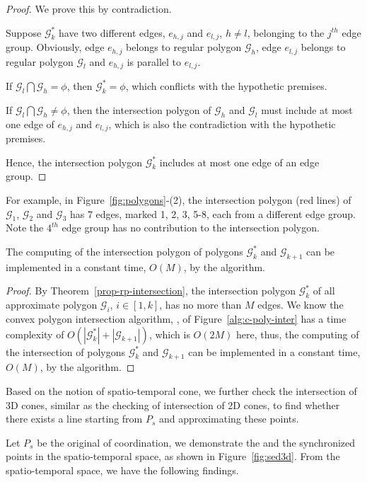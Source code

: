 \begin{proof}
We prove this by contradiction.

Suppose $\mathcal{G}^*_k$ have two different edges, $e_{h,j}$ and $e_{l,j}$, $h\ne l$, belonging to the $j^{th}$ edge group. Obviously, edge
$e_{h,j}$ belongs to regular polygon $\mathcal{G}_h$, edge $e_{l,j}$ belongs to regular polygon $\mathcal{G}_l$ and $e_{h,j}$ is parallel to
$e_{l,j}$.

If $\mathcal{G}_l \bigcap \mathcal{G}_h = \phi$, then $\mathcal{G}^*_k=\phi$, which conflicts with the hypothetic premises.

If $\mathcal{G}_l \bigcap \mathcal{G}_h \ne \phi$, then the intersection polygon of $\mathcal{G}_h$ and $\mathcal{G}_l$ must include at most
one edge of $e_{h,j}$ and $e_{l,j}$, which is also the contradiction with the hypothetic premises.

Hence, the intersection polygon $\mathcal{G}^*_k$ includes at most one edge of an edge group.
%
\end{proof}



For example, in Figure~\ref{fig:polygons}-(2), the intersection polygon (red lines) of $\mathcal{G}_1$, $\mathcal{G}_2$ and $\mathcal{G}_3$ has 7 edges, marked 1, 2, 3, 5-8, each from a different edge group. Note the $4^{th}$ edge group has no contribution to the intersection polygon.

\begin{prop}
\label{prop-cpi-time}
The computing of the intersection polygon of polygons $\mathcal{G}^*_k$ and $\mathcal{G}_{k+1}$ can be implemented in a constant time, \ie $O(M)$, by the \cpia algorithm.
\end{prop}

\begin{proof}
By Theorem~\ref{prop-rp-intersection}, the intersection polygon $\mathcal{G}^*_k$ of all approximate polygon $\mathcal{G}_i$, $i \in [1, k]$, has no more than $M$ edges.
We know the convex polygon intersection algorithm, \ie \cpia, of Figure~\ref{alg:c-poly-inter} has a time complexity of $O(|\mathcal{G}^*_k| + |\mathcal{G}_{k+1}|)$, which is $O(2M)$ here, thus, the computing of the intersection of polygons $\mathcal{G}^*_k$ and $\mathcal{G}_{k+1}$ can be implemented in a constant time, \ie $O(M)$, by the \cpia algorithm.
\end{proof}



Based on the notion of spatio-temporal cone, we further check the intersection of 3D cones, similar as the checking of intersection of 2D cones, to find whether there exists a line starting from $P_s$ and approximating these points.


Let $P_s$ be the original of coordination, we demonstrate the \sed and the synchronized points in the spatio-temporal space, as shown in Figure~\ref{fig:sed3d}.
From the spatio-temporal space, we have the following findings.







